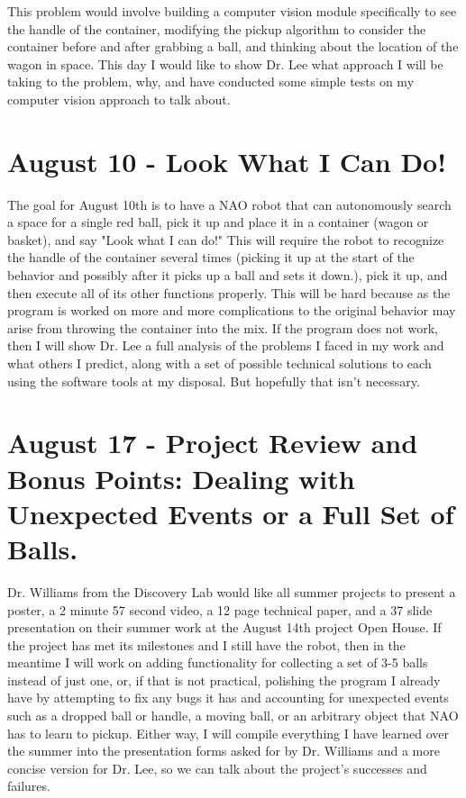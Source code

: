 \documentclass[12pt]{report}
\begin{document}
This problem would involve building a computer vision module specifically to see the handle of the container, modifying the pickup algorithm to
consider the container before and after grabbing a ball, and thinking about the location of the wagon in space.  This day I would like to show
Dr. Lee what approach I will be taking to the problem, why, and have conducted some simple tests on my computer vision approach to talk about. 


\section{August 10 - Look What I Can Do!}

\indent
The goal for August 10th is to have a NAO robot that can autonomously search a space for a single red ball, pick it up and place it in a container
(wagon or basket), and say "Look what I can do!"  This will require the robot to recognize the handle of the container several times (picking it up
at the start of the behavior and possibly after it picks up a ball and sets it down.), pick it up, and then execute all of its other functions properly.
This will be hard because as the program is worked on more and more complications to the original behavior may arise from throwing the container into the
mix.  If the program does not work, then I will show Dr. Lee a full analysis of the problems I faced in my work and what others I predict, along with
a set of possible technical solutions to each using the software tools at my disposal.  But hopefully that isn't necessary.


\section{August 17 - Project Review and Bonus Points:  Dealing with Unexpected Events or a Full Set of Balls.}

\indent
Dr. Williams from the Discovery Lab would like all summer projects to present a poster, a 2 minute 57 second video, a 12 page technical paper, and
a 37 slide presentation on their summer work at the August 14th project Open House.  If the project has met its milestones and I still have the robot, 
then in the meantime I will work on adding functionality for collecting a set of 3-5 balls instead of just one, or, if that is not practical, polishing the
program I already have by attempting to fix any bugs it has and accounting for unexpected events such as a dropped ball or handle, a moving ball,
or an arbitrary object that NAO has to learn to pickup.  Either way, I will compile everything I have learned over the summer into the presentation
forms asked for by Dr. Williams and a more concise version for Dr. Lee, so we can talk about the project's successes and failures.
\end{document}
